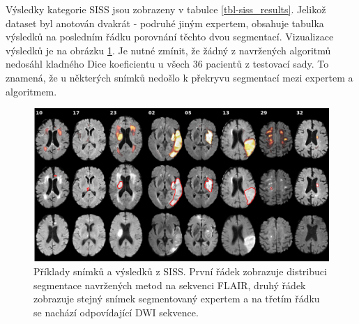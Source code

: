 \documentclass[11pt]{article}
\begin{document}
Výsledky kategorie SISS jsou zobrazeny v tabulce \ref{tbl-siss_results}. Jelikož dataset byl anotován dvakrát - podruhé jiným expertem, obsahuje tabulka výsledků na posledním řádku porovnání těchto dvou segmentací. Vizualizace výsledků je na obrázku \ref{img-isles2015}. Je nutné zmínit, že žádný z navržených algoritmů nedosáhl kladného Dice koeficientu u všech 36 pacientů z testovací sady. To znamená, že u některých snímků nedošlo k překryvu segmentací mezi expertem a algoritmem.

\begin{figure}[htp]
	\centering
	\includegraphics[width=\textwidth]{isles2015}
	\caption{Příklady snímků a výsledků z SISS. První řádek zobrazuje distribuci segmentace navržených metod na sekvenci FLAIR, druhý řádek zobrazuje stejný snímek segmentovaný expertem a na třetím řádku se nachází odpovídající DWI sekvence.}
	\label{img-isles2015}
\end{figure}
\end{document}
